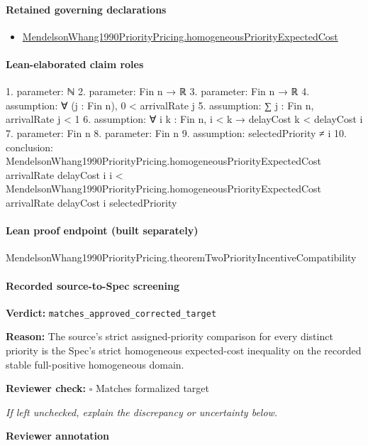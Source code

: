 \documentclass[10pt]{article}
\newcommand{\reviewerbox}{%
  \par\noindent\fbox{\parbox{0.96\linewidth}{\rule{0pt}{0.38in}}}\par
}
\newcommand{\reviewmatch}[1]{%
  \par\noindent\textbf{Reviewer check:} $\square$\; #1\par
  \noindent\emph{If left unchecked, explain the discrepancy or uncertainty below.}\par
}
\begin{document}
\paragraph{Retained governing declarations}
\begin{itemize}\raggedright
\item \hyperlink{paper-prerequisite-53f58e4a79f3cd3c}{Mendelson\allowbreak{}Whang1990\allowbreak{}Priority\allowbreak{}Pricing.\allowbreak{}homogeneous\allowbreak{}Priority\allowbreak{}Expected\allowbreak{}Cost}
\end{itemize}
\paragraph{Lean-elaborated claim roles}\begin{ReviewVerbatim}
1. parameter: ℕ
2. parameter: Fin n → ℝ
3. parameter: Fin n → ℝ
4. assumption: ∀ (j : Fin n), 0 < arrivalRate j
5. assumption: ∑ j : Fin n, arrivalRate j < 1
6. assumption: ∀ {i k : Fin n}, i < k → delayCost k < delayCost i
7. parameter: Fin n
8. parameter: Fin n
9. assumption: selectedPriority ≠ i
10. conclusion: MendelsonWhang1990PriorityPricing.homogeneousPriorityExpectedCost arrivalRate delayCost i i <
  MendelsonWhang1990PriorityPricing.homogeneousPriorityExpectedCost arrivalRate delayCost i selectedPriority
\end{ReviewVerbatim}

\paragraph{Lean proof endpoint (built separately)}\begin{ReviewVerbatim}
MendelsonWhang1990PriorityPricing.theoremTwoPriorityIncentiveCompatibility
\end{ReviewVerbatim}

\paragraph{Recorded source-to-Spec screening}
\textbf{Verdict:} \texttt{matches\_approved\_corrected\_target}
\\
{\raggedright
\textbf{Reason:} The source's strict assigned-\allowbreak{}priority comparison for every distinct priority is the Spec's strict homogeneous expected-\allowbreak{}cost inequality on the recorded stable full-\allowbreak{}positive homogeneous domain.\allowbreak{}
\par}
\reviewmatch{Matches formalized target}
\noindent\textbf{Reviewer annotation}\par
\reviewerbox
\clearpage
\hypertarget{source-claim-a044a878df73f034}{}
\end{document}
